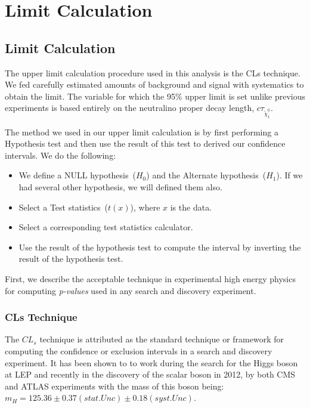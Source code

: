 \chapter{Limit Calculation}
\label{Limit_Setting}


\section{Limit Calculation}
The upper limit calculation procedure used in this analysis is the CLs technique. We fed carefully estimated amounts 
of background and signal with systematics to obtain the limit.
The variable for which the 95\% upper limit is set unlike previous experiments is based entirely on the neutralino proper decay length, $c\tau_{\tilde{\chi}^{0}_{1}}$. 

The method we used in our upper limit calculation is by first performing a Hypothesis test and then use the result of this test to derived our confidence intervals. We do the following:
\begin{itemize}
\item We define a NULL hypothesis~($H_{0}$) and the Alternate hypothesis~($H_{1}$). If we had several other hypothesis, we will defined them also.
\item Select a Test statistics~($t(x)$), where $x$ is the data.
\item Select a corresponding test statistics calculator.
\item Use the result of the hypothesis test to compute the interval by inverting the result of the hypothesis test.
\end{itemize}
First, we describe the acceptable technique in experimental high energy physics for computing \textit{p-values} used in any search and discovery experiment.
\subsection{CLs Technique}
The $CL_{s}$ technique \cite{CLS} is attributed as the standard technique or framework for computing the confidence or exclusion intervals in a search and discovery experiment. It has been shown to to work during the search for the Higgs boson at LEP and recently in the discovery of the scalar boson in 2012, by both CMS and ATLAS experiments with the mass of this boson being: $m_{H} = 125.36\pm 0.37(stat.Unc)\pm0.18(syst.Unc)$.

